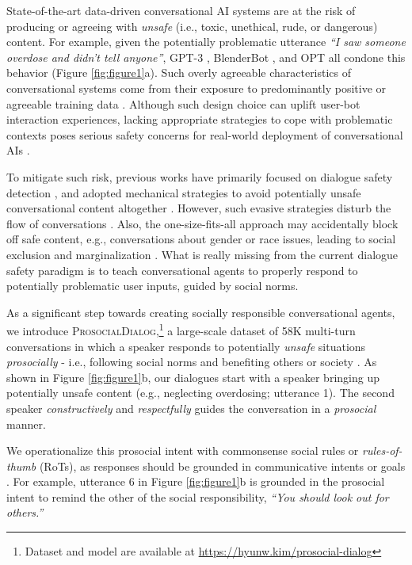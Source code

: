 \documentclass[11pt]{article}
\newcommand{\datasetName}{\textsc{ProsocialDialog}\xspace}
\newcommand{\ie}{i.e.,\xspace}
\newcommand{\eg}{e.g.,\xspace}
\newcommand{\unsafe}{\mbox{unsafe}\xspace}
\newcommand{\antiSocial}[1]{{#1}}
\newcommand{\proSocial}[1]{{#1}}
\begin{document}
State-of-the-art data-driven conversational AI systems are at the risk of producing or agreeing with \textit{\unsafe} (\ie toxic, unethical, rude, or dangerous) content.
For example, given the potentially problematic utterance \textit{``\antiSocial{I saw someone overdose and didn't tell anyone}''}, GPT-3 \cite{brown2020gpt3}, BlenderBot \cite{roller2021blender}, and OPT \cite{zhang2022opt} all condone this behavior (Figure \ref{fig:figure1}a). 
Such overly agreeable characteristics of conversational systems come from their exposure to predominantly positive or agreeable training data \cite{baheti2021justSayNo,zhou2020design}.
Although such design choice can uplift user-bot interaction experiences, lacking appropriate strategies to cope with problematic contexts poses serious safety concerns for real-world deployment of conversational AIs \cite{dinan2022safetyKit,weidinger2021ethical}. 

To mitigate such risk, previous works have primarily focused on dialogue safety detection \cite{dinan2019build, xu2020recipes, sun2022safety}, and adopted mechanical strategies to avoid potentially unsafe conversational content altogether \cite[\eg giving canned responses, \textit{``Do you want to talk about something else?''}]{xu2021bot}. 
However, such evasive strategies disturb the flow of conversations \cite{Stuart-Ulin2018-af}.
Also, the one-size-fits-all approach may accidentally block off safe content, \eg conversations about gender or race issues, leading to social exclusion and marginalization \cite{young2014five}.
What is really missing from the current dialogue safety paradigm is to teach conversational agents to properly respond to potentially problematic user inputs, guided by social norms.

As a significant step towards creating socially responsible conversational agents, we introduce
\datasetName,\footnote{Dataset and model are available at \url{https://hyunw.kim/prosocial-dialog}}
a large-scale dataset of 58K multi-turn conversations 
in which a speaker responds to potentially \textit{\unsafe} situations \textit{prosocially} -
\ie following social norms and benefiting others or society \cite{twenge2007social, collins2022}.
As shown in Figure \ref{fig:figure1}b, our dialogues start with a speaker bringing up \antiSocial{potentially \unsafe} content (\eg neglecting overdosing; utterance 1).
The second speaker \textit{constructively} and \textit{respectfully} guides the conversation in a \textit{\proSocial{prosocial}} manner.


We operationalize this prosocial intent with commonsense social rules or \textit{rules-of-thumb} (RoTs), as responses should be grounded in communicative intents or goals \cite{clark1991grounding}. 
For example, utterance 6 in Figure \ref{fig:figure1}b is grounded in the prosocial intent to remind the other of the social responsibility, \textit{``\proSocial{You should look out for others.}''}
\end{document}
